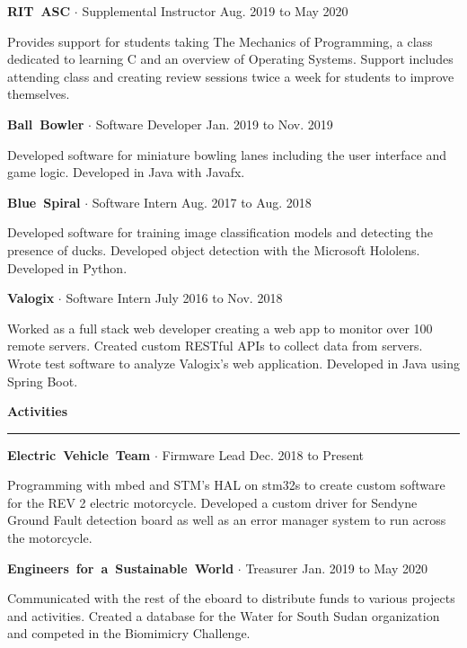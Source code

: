 \documentclass{article}
\newcommand{\rSection}[1] {
  \textcolor{header-blue} {
    \textbf{{\fontsize{0.5cm}{0.45cm}\selectfont \hbox{#1}}} \\
    \rule{0.30\textwidth}{0.1cm}
  }
}
\newcommand{\rSubSubSection}[1] {
  \textbf{{\fontsize{0.35cm}{0.45cm}\selectfont \hbox{#1}}}
}
\begin{document}
\rSubSubSection{RIT ASC} $ \cdot $ Supplemental Instructor \hfill Aug. 2019 to May 2020 \par 
Provides support for students taking The Mechanics of Programming, a class dedicated to learning C and an overview of Operating
Systems. Support includes attending class and creating review sessions twice a week for students to improve themselves. \par \bigskip

\rSubSubSection{Ball Bowler} $ \cdot $ Software Developer \hfill Jan. 2019 to Nov. 2019 \par
Developed software for miniature bowling lanes including the user interface and game logic. Developed in Java with Javafx. \par \bigskip

\rSubSubSection{Blue Spiral} $ \cdot $ Software Intern \hfill Aug. 2017 to Aug. 2018 \par
Developed software for training image classification models and detecting the presence of ducks. Developed object
detection with the Microsoft Hololens. Developed in Python. \par \bigskip

\rSubSubSection{Valogix} $ \cdot $ Software Intern \hfill July 2016 to Nov. 2018 \par
Worked as a full stack web developer creating a web app to monitor over 100 remote servers. Created custom RESTful APIs to collect
data from servers. Wrote test software to analyze Valogix's web application. Developed in Java using Spring Boot. \par \bigskip

\rSection{Activities} \par

\rSubSubSection{Electric Vehicle Team} $ \cdot $ Firmware Lead \hfill Dec. 2018 to Present \par
Programming with mbed and STM's HAL on stm32s to create custom software for the REV 2 electric motorcycle. Developed a custom driver
for Sendyne Ground Fault detection board as well as an error manager system to run across the motorcycle. \par \bigskip

\rSubSubSection{Engineers for a Sustainable World} $ \cdot $ Treasurer \hfill Jan. 2019 to May 2020 \par
Communicated with the rest of the eboard to distribute funds to various projects and activities. Created a database for the Water
for South Sudan organization and competed in the Biomimicry Challenge. \par \bigskip
\end{document}

